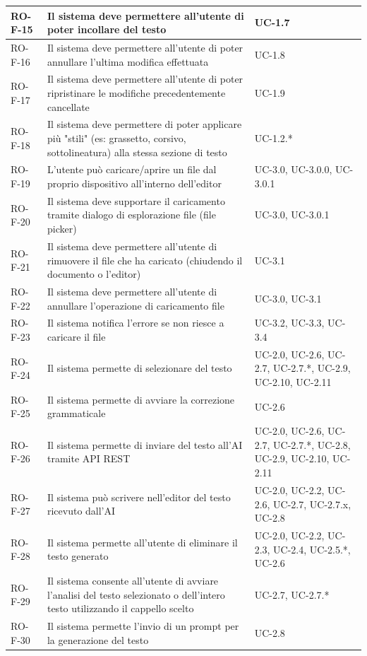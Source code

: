 \documentclass[11pt,a4paper]{article}
\begin{document}
\begin{longtable}{|p{}|>{\raggedright\arraybackslash}p{}|p{}|}
\hline
RO-F-15 & Il sistema deve permettere all'utente di poter incollare del testo & UC-1.7 \\
\hline
RO-F-16 & Il sistema deve permettere all'utente di poter annullare l'ultima modifica effettuata & UC-1.8 \\
\hline
RO-F-17 & Il sistema deve permettere all'utente di poter ripristinare le modifiche precedentemente cancellate & UC-1.9 \\
\hline
RO-F-18 & Il sistema deve permettere di poter applicare più "stili" (es: grassetto, corsivo, sottolineatura) alla stessa sezione di testo & UC-1.2.* \\
\hline
RO-F-19 & L'utente può caricare/aprire un file dal proprio dispositivo all'interno dell'editor & UC-3.0, UC-3.0.0, UC-3.0.1 \\
\hline
RO-F-20 & Il sistema deve supportare il caricamento tramite dialogo di esplorazione file (file picker) & UC-3.0, UC-3.0.1 \\
\hline
RO-F-21 & Il sistema deve permettere all'utente di rimuovere il file che ha caricato (chiudendo il documento o l'editor) & UC-3.1 \\
\hline
RO-F-22 & Il sistema deve permettere all'utente di annullare l'operazione di caricamento file & UC-3.0, UC-3.1 \\
\hline
RO-F-23 & Il sistema notifica l'errore se non riesce a caricare il file & UC-3.2, UC-3.3, UC-3.4 \\
\hline
RO-F-24 & Il sistema permette di selezionare del testo & UC-2.0, UC-2.6, UC-2.7, UC-2.7.*, UC-2.9, UC-2.10, UC-2.11 \\
\hline
RO-F-25 & Il sistema permette di avviare la correzione grammaticale & UC-2.6 \\
\hline
RO-F-26 & Il sistema permette di inviare del testo all'AI tramite API REST & UC-2.0, UC-2.6, UC-2.7, UC-2.7.*, UC-2.8, UC-2.9, UC-2.10, UC-2.11 \\
\hline
RO-F-27 & Il sistema può scrivere nell'editor del testo ricevuto dall'AI & UC-2.0, UC-2.2, UC-2.6, UC-2.7, UC-2.7.x, UC-2.8 \\
\hline
RO-F-28 & Il sistema permette all'utente di eliminare il testo generato & UC-2.0, UC-2.2, UC-2.3, UC-2.4, UC-2.5.*, UC-2.6 \\
\hline
RO-F-29 & Il sistema consente all'utente di avviare l'analisi del testo selezionato o dell'intero testo utilizzando il cappello scelto & UC-2.7, UC-2.7.* \\
\hline
RO-F-30 & Il sistema permette l'invio di un prompt per la generazione del testo & UC-2.8 \\

\end{longtable}
\end{document}
